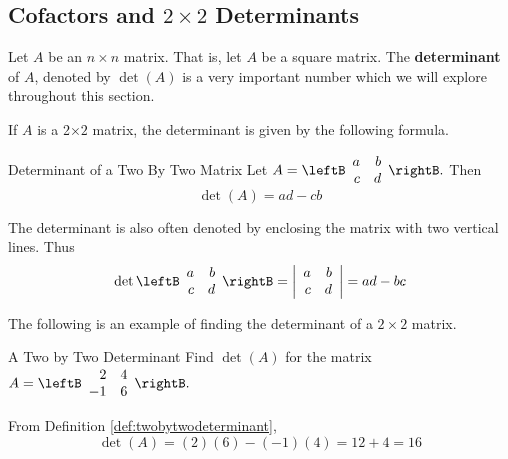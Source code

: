 \subsection{Cofactors and \texorpdfstring{$2\times 2$}{2x2} Determinants}

Let $A$ be an $n\times n$ matrix. That is, let $A$ be a square matrix. The \textbf{determinant}  of $A$, denoted
by $\det \left( A\right) $ is a very important number which we will explore throughout this section. 

If $A$ is a 2$\times 2$
matrix, the determinant is given by the following formula.

\begin{definition}{Determinant of a Two By Two Matrix}\label{def:twobytwodeterminant}
Let $A=\leftB
\begin{array}{rr}
a & b \\
c & d
\end{array}
\rightB .$ Then
\begin{equation*}
\det \left( A\right)  = ad-cb
\end{equation*}
\end{definition}

The determinant is also often denoted by enclosing the matrix with two
vertical lines. Thus
\begin{equation*}
\det \leftB
\begin{array}{rr}
a & b \\
c & d
\end{array}
\rightB =\left|
\begin{array}{rr}
a & b \\
c & d
\end{array}
\right| 
=ad - bc
\end{equation*}

The following is an example of finding the determinant of a $2 \times 2$ matrix.

\begin{example}{A Two by Two Determinant}\label{exa:twobytwodeterminant}
Find $\det\left(A\right) $ for the matrix
$A =  \leftB
\begin{array}{rr}
2 & 4 \\
-1 & 6
\end{array}
\rightB .$
\end{example}

\begin{solution} From Definition \ref{def:twobytwodeterminant},
\begin{equation*}
\det \left( A\right) = \left( 2\right) \left( 6\right) -\left(
-1\right) \left( 4\right) = 12 + 4 = 16
\end{equation*}
\end{solution} 

